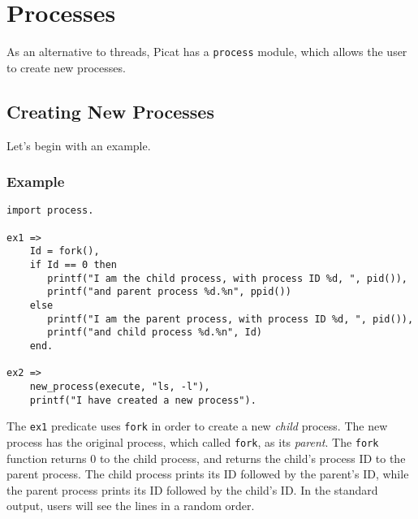 
\chapter{\label{chapter:process}Processes}

As an alternative to threads, Picat has a \texttt{process} module, which allows the user to create new processes.

\section{Creating New Processes}
Let's begin with an example.

\subsection*{Example}
\begin{verbatim}
import process.

ex1 =>
    Id = fork(),
    if Id == 0 then
       printf("I am the child process, with process ID %d, ", pid()),
       printf("and parent process %d.%n", ppid())
    else
       printf("I am the parent process, with process ID %d, ", pid()),
       printf("and child process %d.%n", Id)
    end.

ex2 =>
    new_process(execute, "ls, -l"),
    printf("I have created a new process").
\end{verbatim}

The \texttt{ex1} predicate uses \texttt{fork} in order to create a new \emph{child} process.  The new process has the original process, which called \texttt{fork}, as its \emph{parent}.  The \texttt{fork} function returns $0$ to the child process, and returns the child's process ID to the parent process.  The child process prints its ID followed by the parent's ID, while the parent process prints its ID followed by the child's ID.  In the standard output, users will see the lines in a random order.

